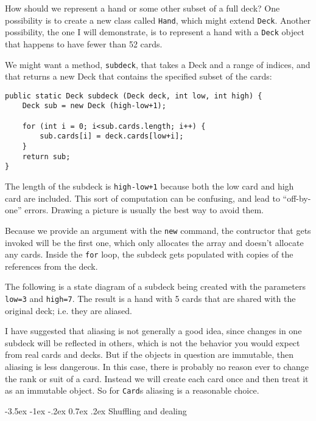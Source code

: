 \documentclass{book}
\makeatletter
\renewcommand{\section}{\@startsection 
    {section} {1} {0mm}%
    {-3.5ex \@plus -1ex \@minus -.2ex}%
    {0.7ex \@plus.2ex}%
    {\normalfont\Large\bfseries}}
\newcommand{\beforefig}{\vspace{1.3\parskip}}
\newcommand{\afterfig}{\vspace{-0.2\parskip}}
\newcommand{\myfig}[1]{
    \beforefig
    \centerline{\epsfig{#1,scale=0.8}}
    \afterfig
}
\makeatother
\begin{document}
How should we represent a hand or some other subset of a full deck?
One possibility is to create a new class called {\tt Hand}, which
might extend {\tt Deck}.  Another possibility, the one I will
demonstrate, is to represent a hand with a {\tt Deck} object that
happens to have fewer than 52 cards.

We might want a method, {\tt subdeck}, that takes a Deck
and a range of indices, and that returns a new Deck that
contains the specified subset of the cards:

\begin{verbatim}
public static Deck subdeck (Deck deck, int low, int high) {
    Deck sub = new Deck (high-low+1);
	
    for (int i = 0; i<sub.cards.length; i++) {
        sub.cards[i] = deck.cards[low+i];
    }
    return sub;
}
\end{verbatim}

The length of the subdeck is {\tt high-low+1} because both the low
card and high card are included.  This sort of computation can be
confusing, and lead to ``off-by-one'' errors.  Drawing a picture is
usually the best way to avoid them.


Because we provide an argument with the {\tt new} command, the
contructor that gets invoked will be the first one, which only
allocates the array and doesn't allocate any cards.  Inside the
{\tt for} loop, the subdeck gets populated with copies of the
references from the deck.

The following is a state diagram of a subdeck being created with the
parameters {\tt low=3} and {\tt high=7}.  The result is a hand with 5
cards that are shared with the original deck; i.e. they are aliased.

\myfig{figure=figs/subdeck.eps}


I have suggested that aliasing is not generally a good idea, since
changes in one subdeck will be reflected in others, which is not the
behavior you would expect from real cards and decks.  But if the
objects in question are immutable, then aliasing is less dangerous.
In this case, there is probably no reason ever to change the
rank or suit of a card.  Instead we will create each card
once and then treat it as an immutable object.  So for {\tt Card}s
aliasing is a reasonable choice.


\section{Shuffling and dealing}
\end{document}
